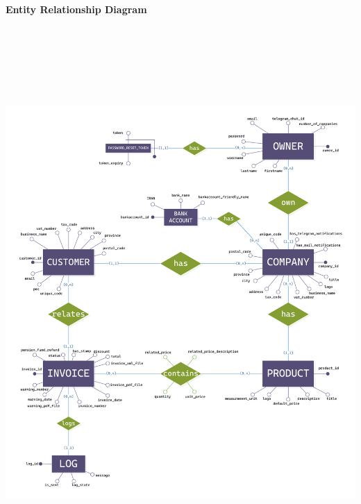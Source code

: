 \paragraph[]{Entity Relationship Diagram} \hspace{1cm} \par
\includegraphics[height=590pt, keepaspectratio]{resources/ERSchema.pdf}



